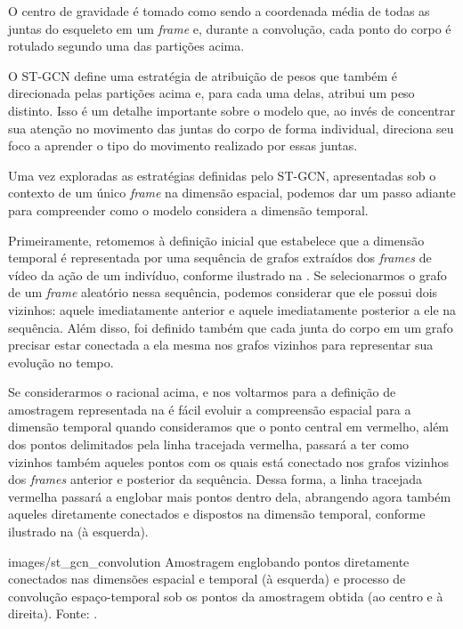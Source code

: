 O centro de gravidade é tomado como sendo a coordenada média de todas as juntas do esqueleto em um \textit{frame} e, durante a convolução, cada ponto do corpo é rotulado segundo uma das partições acima.

O ST-GCN define uma estratégia de atribuição de pesos que também é direcionada pelas partições acima e, para cada uma delas, atribui um peso distinto. Isso é um detalhe importante sobre o modelo que, ao invés de concentrar sua atenção no movimento das juntas do corpo de forma individual,  direciona seu foco a aprender o tipo do movimento realizado por essas juntas.

Uma vez exploradas as estratégias definidas pelo ST-GCN, apresentadas sob o contexto de um único \textit{frame} na dimensão espacial, podemos dar um passo adiante para compreender como o modelo considera a dimensão temporal. 

Primeiramente, retomemos à definição inicial que estabelece que a dimensão temporal é representada por uma sequência de grafos extraídos dos \textit{frames} de vídeo da ação de um indivíduo, conforme ilustrado na . Se selecionarmos o grafo de um \textit{frame} aleatório nessa sequência, podemos considerar que ele possui dois vizinhos: aquele imediatamente anterior e aquele imediatamente posterior a ele na sequência. Além disso, foi definido também que cada junta do corpo em um grafo precisar estar conectada a ela mesma nos grafos vizinhos para representar sua evolução no tempo.

Se considerarmos o racional acima, e nos voltarmos para a definição de amostragem representada na  é fácil evoluir a compreensão espacial para a dimensão temporal quando consideramos que o ponto central em vermelho, além dos pontos delimitados pela linha tracejada vermelha, passará a ter como vizinhos também aqueles pontos com os quais está conectado nos grafos vizinhos dos \textit{frames} anterior e posterior da sequência. Dessa forma, a linha tracejada vermelha passará a englobar mais pontos dentro dela, abrangendo agora também aqueles diretamente conectados e dispostos na dimensão temporal, conforme ilustrado na  (à esquerda).

    {images/st_gcn_convolution}
    {Amostragem englobando pontos diretamente conectados nas dimensões espacial e temporal (à esquerda) e processo de convolução espaço-temporal sob os pontos da amostragem obtida (ao centro e à direita).  Fonte: \cite[p. 3]{st-gcn-2018}.}

